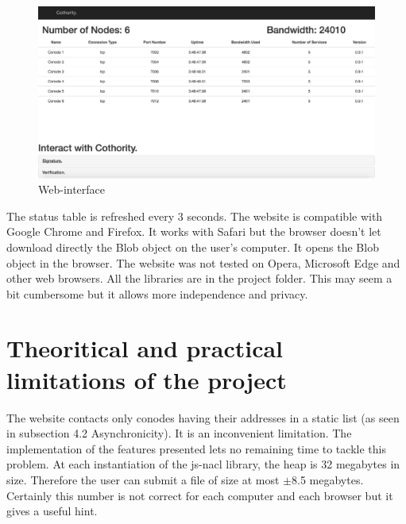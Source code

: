 \documentclass[11pt, a4paper, twoside, openright, openany]{article}
\begin{document}
\begin{figure}[ht!]
\centering
\includegraphics[width=125mm]{interface.jpg}
\caption{Web-interface}
\end{figure}

The status table is refreshed every 3 seconds.
\newline \newline
The website is compatible with Google Chrome and Firefox. It works with Safari
but the browser doesn't let download directly the Blob object on the user's computer. It
opens the Blob object in the browser. The website was not tested on Opera, Microsoft Edge and other web browsers.
\newline \newline
All the libraries are in the project folder. This may seem a bit cumbersome but
it allows more independence and privacy.
\newline

\section{Theoritical and practical limitations of the project}
The website contacts only conodes having their addresses in a static list
(as seen in subsection 4.2 Asynchronicity). It is an inconvenient limitation.
The implementation of the features presented lets no remaining time to tackle
this problem.
\newline
At each instantiation of the js-nacl library, the heap is 32 megabytes in size. Therefore
the user can submit a file of size at most \(\pm\)8.5 megabytes. Certainly this number is
not correct for each computer and each browser but it gives a useful hint.
\newline
\end{document}
